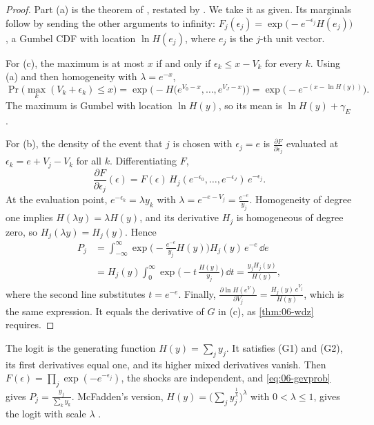 \begin{proof}
Part (a) is the theorem of \citet{McFadden1978}, restated by \citet[eqs.~3.29--3.31, p.~1421]{McFadden1984}.
We take it as given. Its marginals follow by sending the other arguments to infinity:
$F_j(\epsilon_j) = \exp\big(-e^{-\epsilon_j}H(e_j)\big)$, a Gumbel CDF with location $\ln H(e_j)$, where $e_j$ is the
$j$-th unit vector.

For (c), the maximum is at most $x$ if and only if $\epsilon_k \le x - V_k$ for every $k$. Using (a) and then
homogeneity with $\lambda = e^{-x}$,
\begin{equation*}
\Pr\Big(\max_k(V_k + \epsilon_k) \le x\Big) = \exp\Big(-H\big(e^{V_0 - x}, \dots, e^{V_J - x}\big)\Big)
= \exp\Big(-e^{-\left(x - \ln H(y)\right)}\Big).
\end{equation*}
The maximum is Gumbel with location $\ln H(y)$, so its mean is $\ln H(y) + \gamma_E$.

For (b), the density of the event that $j$ is chosen with $\epsilon_j = e$ is $\frac{\partial F}{\partial\epsilon_j}$
evaluated at $\epsilon_k = e + V_j - V_k$ for all $k$. Differentiating $F$,
\begin{equation*}
\frac{\partial F}{\partial \epsilon_j}(\epsilon) = F(\epsilon)\,H_j(e^{-\epsilon_0}, \dots, e^{-\epsilon_J})\,e^{-\epsilon_j}.
\end{equation*}
At the evaluation point, $e^{-\epsilon_k} = \lambda y_k$ with $\lambda = e^{-e - V_j} = \frac{e^{-e}}{y_j}$. Homogeneity of
degree one implies $H(\lambda y) = \lambda H(y)$, and its derivative $H_j$ is homogeneous of degree zero, so
$H_j(\lambda y) = H_j(y)$. Hence
\begin{align*}
P_j &= \int_{-\infty}^{\infty}\exp\Big(-\frac{e^{-e}}{y_j}H(y)\Big)H_j(y)\,e^{-e}\,\dd e \\
&= H_j(y)\int_0^\infty\exp\Big(-t\,\frac{H(y)}{y_j}\Big)\,\dd t
= \frac{y_jH_j(y)}{H(y)},
\end{align*}
where the second line substitutes $t = e^{-e}$. Finally,
$\frac{\partial\ln H(e^{V})}{\partial V_j} = \frac{H_j(y)\,e^{V_j}}{H(y)}$, which is the same expression. It equals the
derivative of $G$ in (c), as \cref{thm:06-wdz} requires.
\end{proof}

The logit is the generating function $H(y) = \sum_j y_j$. It satisfies (G1) and (G2), its first derivatives
equal one, and its higher mixed derivatives vanish. Then $F(\epsilon) = \prod_j\exp(-e^{-\epsilon_j})$, the shocks
are independent, and \eqref{eq:06-gevprob} gives $P_j = \frac{y_j}{\sum_k y_k}$. McFadden's version,
$H(y) = \big(\sum_j y_j^{\frac{1}{\lambda}}\big)^{\lambda}$ with $0 < \lambda \le 1$, gives the logit with scale $\lambda$
\citep[eq.~3.32, p.~1421]{McFadden1984}.

